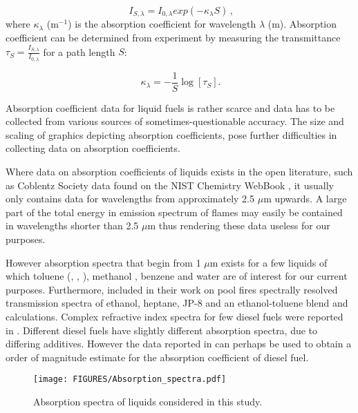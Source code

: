 \begin{equation}
\label{eqn_beerslaw}
\ I_{S,\lambda} = I_{0,\lambda} exp\left( -\kappa_\lambda S \right) \,\mbox{,}
\end{equation}
where $\kappa_{\lambda}$ (m$^{-1}$) is the absorption coefficient for wavelength $\lambda$ (m).  Absorption coefficient can be determined from experiment by measuring the transmittance $\tau_{S}=\frac{I_{S,\lambda}}{I_{0,\lambda}}$ for a path length $S$:

\begin{equation}
\label{eqn_klambda}
\ \kappa_\lambda = -\frac{1}{S} \log [\tau_S] \mbox{.}
\end{equation}

Absorption coefficient data for liquid fuels is rather scarce and data has to be collected from various sources of sometimes-questionable accuracy. The size and scaling of graphics depicting absorption coefficients, pose further difficulties in collecting data on absorption coefficients.

Where data on absorption coefficients of liquids exists in the open literature, such as Coblentz Society data found on the NIST Chemistry WebBook \cite{Coblentz:1}, it usually  only contains data for wavelengths from approximately 2.5 $\mu$m upwards. A large part of the total energy in emission spectrum of flames may easily be contained in wavelengths shorter than 2.5 $\mu$m thus rendering these data useless for our purposes.

However absorption spectra that begin from 1 $\mu$m exists for a few liquids of which toluene (\cite{Bertie:JMS2005}, \cite{Bertie:AS1994b}, \cite{Bertie:AS1994a}), methanol \cite{Bertie:AS1993a}, benzene \cite{Bertie:AS1993b} and water \cite{Bertie:AS1996} are of interest for our current purposes. Furthermore, \cite{Suo-Anttila:PCT2009} included in their work on pool fires spectrally resolved transmission spectra of ethanol, heptane, JP-8 and an ethanol-toluene blend and calculations. Complex refractive index spectra for few diesel fuels were reported in \cite{Sazhin:IJHMT2004b}. Different diesel fuels have slightly different absorption spectra, due to differing additives. However the data reported in \cite{Sazhin:IJHMT2004b} can perhaps be used to obtain a order of magnitude estimate for the absorption coefficient of diesel fuel.

\begin{figure}[ht]
    \label{fig_absspec}
    \centering
    \texttt{[image: FIGURES/Absorption\_spectra.pdf]}
    \caption{Absorption spectra of liquids considered in this study.}
\end{figure}

